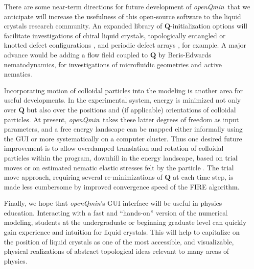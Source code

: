 \documentclass[utf8]{frontiersFPHY} %
\newcommand{\DAB}[1]{\textcolor{blue}{#1}}
\newcommand{\Q}{\mathbf{Q}}
\def\PackageName{\textit{openQmin}}
\begin{document}
There are some near-term directions for future development of  \PackageName\ that we anticipate will increase the usefulness of this open-source software to the liquid crystals research community. 
 An expanded  library of $\Q$-initialization options will facilitate investigations of chiral liquid crystals, topologically entangled or knotted defect configurations \citep{Ravnik2007,Tkalec:2011lj,tasinkevych2014splitting,machon2014knotted}, and periodic defect arrays \DAB{\citep{murray2014creating,suh2019topological}}, for example. A major advance would be adding a flow field coupled to $\Q$ by Beris-Edwards nematodynamics, for investigations of microfluidic geometries and active nematics.


Incorporating motion of colloidal particles into the modeling is another area for useful developments. In the experimental system, energy is minimized not only over $\Q$ but also over the positions and (if applicable) orientations of colloidal particles. At present, \PackageName\ takes these latter degrees of freedom as input parameters, and a free energy landscape can be mapped either informally using the GUI or more systematically on a computer cluster. Thus one desired future improvement is to allow overdamped translation and rotation of colloidal particles within the program,  downhill in the energy landscape, based on trial moves or on estimated nematic elastic stresses felt by the particle  \citep{vskarabot2008hierarchical}. The trial move approach, requiring several re-minimizations of $\Q$ at each time step, is made less cumbersome by improved convergence speed of the FIRE algorithm. 

Finally, we hope that \PackageName's GUI interface will be useful in physics education. Interacting with  a fast and ``hands-on'' version of the numerical modeling, students at the undergraduate or beginning graduate level can quickly gain experience and intuition for liquid crystals. This will help to capitalize on the position of  liquid crystals as one of the most accessible, and visualizable, physical realizations of  abstract topological ideas relevant to many areas of physics. 


 
\end{document}
